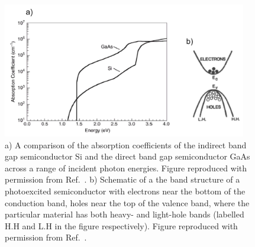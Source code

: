 \documentclass[11pt, twoside]{report}
\begin{document}
\begin{figure}[h!]
  \centering
    \includegraphics[width=0.95\textwidth]{figures/ab+m_eff.png}
    \caption[a) A comparison of the absorption coefficients of the indirect band gap semiconductor Si and the direct band gap semiconductor GaAs across a range of incident photon energies. b) Schematic of a the band structure of a photoexcited semiconductor with electrons near the bottom of the conduction band, holes near the top of the valence band, where the particular material has both heavy- and light-hole bands (labelled H.H and L.H in the figure respectively).]{a) A comparison of the absorption coefficients of the indirect band gap semiconductor Si and the direct band gap semiconductor GaAs across a range of incident photon energies. Figure reproduced with permission from Ref.~. b) Schematic of a the band structure of a photoexcited semiconductor with electrons near the bottom of the conduction band, holes near the top of the valence band, where the particular material has both heavy- and light-hole bands (labelled H.H and L.H in the figure respectively). Figure reproduced with permission from Ref.~.}
  \label{ab+m_eff}
\end{figure}
\end{document}
